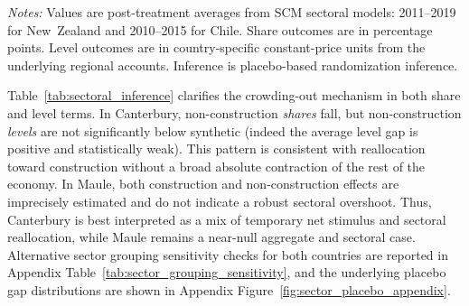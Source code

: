 \documentclass[12pt]{article}
\begin{document}
\begin{table}[H]
\centering
\caption{\textbf{Sectoral SCM inference and crowding-out quantification}}
\label{tab:sectoral_inference}
\small
\setlength{\tabcolsep}{5pt}
\begin{minipage}{0.95\textwidth}\footnotesize\vspace{1ex}
\textit{Notes:} Values are post-treatment averages from SCM sectoral models: 2011--2019 for New~Zealand and 2010--2015 for Chile. Share outcomes are in percentage points. Level outcomes are in country-specific constant-price units from the underlying regional accounts. Inference is placebo-based randomization inference.
\end{minipage}
\end{table}

Table~\ref{tab:sectoral_inference} clarifies the crowding-out mechanism in both share and level terms. In Canterbury, non-construction \emph{shares} fall, but non-construction \emph{levels} are not significantly below synthetic (indeed the average level gap is positive and statistically weak). This pattern is consistent with reallocation toward construction without a broad absolute contraction of the rest of the economy. In Maule, both construction and non-construction effects are imprecisely estimated and do not indicate a robust sectoral overshoot. Thus, Canterbury is best interpreted as a mix of temporary net stimulus and sectoral reallocation, while Maule remains a near-null aggregate and sectoral case. Alternative sector grouping sensitivity checks for both countries are reported in Appendix Table~\ref{tab:sector_grouping_sensitivity}, and the underlying placebo gap distributions are shown in Appendix Figure~\ref{fig:sector_placebo_appendix}.
\end{document}
